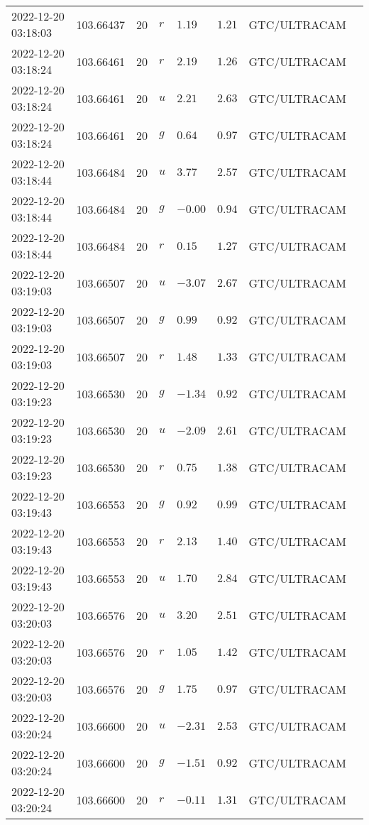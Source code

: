 \documentclass{nature_plusfigure}
\begin{document}
\begin{supplement}
\begin{center}
\begin{longtable}{llllllll}
2022-12-20 03:18:03 & 103.66437 & 20 & $r$ & $1.19$ & $1.21$ & GTC/ULTRACAM &  \\ 
2022-12-20 03:18:24 & 103.66461 & 20 & $r$ & $2.19$ & $1.26$ & GTC/ULTRACAM &  \\ 
2022-12-20 03:18:24 & 103.66461 & 20 & $u$ & $2.21$ & $2.63$ & GTC/ULTRACAM &  \\ 
2022-12-20 03:18:24 & 103.66461 & 20 & $g$ & $0.64$ & $0.97$ & GTC/ULTRACAM &  \\ 
2022-12-20 03:18:44 & 103.66484 & 20 & $u$ & $3.77$ & $2.57$ & GTC/ULTRACAM &  \\ 
2022-12-20 03:18:44 & 103.66484 & 20 & $g$ & $-0.00$ & $0.94$ & GTC/ULTRACAM &  \\ 
2022-12-20 03:18:44 & 103.66484 & 20 & $r$ & $0.15$ & $1.27$ & GTC/ULTRACAM &  \\ 
2022-12-20 03:19:03 & 103.66507 & 20 & $u$ & $-3.07$ & $2.67$ & GTC/ULTRACAM &  \\ 
2022-12-20 03:19:03 & 103.66507 & 20 & $g$ & $0.99$ & $0.92$ & GTC/ULTRACAM &  \\ 
2022-12-20 03:19:03 & 103.66507 & 20 & $r$ & $1.48$ & $1.33$ & GTC/ULTRACAM &  \\ 
2022-12-20 03:19:23 & 103.66530 & 20 & $g$ & $-1.34$ & $0.92$ & GTC/ULTRACAM &  \\ 
2022-12-20 03:19:23 & 103.66530 & 20 & $u$ & $-2.09$ & $2.61$ & GTC/ULTRACAM &  \\ 
2022-12-20 03:19:23 & 103.66530 & 20 & $r$ & $0.75$ & $1.38$ & GTC/ULTRACAM &  \\ 
2022-12-20 03:19:43 & 103.66553 & 20 & $g$ & $0.92$ & $0.99$ & GTC/ULTRACAM &  \\ 
2022-12-20 03:19:43 & 103.66553 & 20 & $r$ & $2.13$ & $1.40$ & GTC/ULTRACAM &  \\ 
2022-12-20 03:19:43 & 103.66553 & 20 & $u$ & $1.70$ & $2.84$ & GTC/ULTRACAM &  \\ 
2022-12-20 03:20:03 & 103.66576 & 20 & $u$ & $3.20$ & $2.51$ & GTC/ULTRACAM &  \\ 
2022-12-20 03:20:03 & 103.66576 & 20 & $r$ & $1.05$ & $1.42$ & GTC/ULTRACAM &  \\ 
2022-12-20 03:20:03 & 103.66576 & 20 & $g$ & $1.75$ & $0.97$ & GTC/ULTRACAM &  \\ 
2022-12-20 03:20:24 & 103.66600 & 20 & $u$ & $-2.31$ & $2.53$ & GTC/ULTRACAM &  \\ 
2022-12-20 03:20:24 & 103.66600 & 20 & $g$ & $-1.51$ & $0.92$ & GTC/ULTRACAM &  \\ 
2022-12-20 03:20:24 & 103.66600 & 20 & $r$ & $-0.11$ & $1.31$ & GTC/ULTRACAM &  \\ 

\end{longtable}
\end{center}
\end{supplement}
\end{document}
